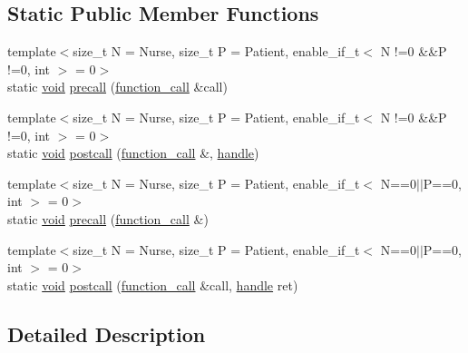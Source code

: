 \subsection*{Static Public Member Functions}
\begin{DoxyCompactItemize}
\item 
{\footnotesize template$<$size\+\_\+t N = Nurse, size\+\_\+t P = Patient, enable\+\_\+if\+\_\+t$<$ N !=0 \&\&\+P !=0, int $>$  = 0$>$ }\\static \mbox{\hyperlink{_s_d_l__opengles2__gl2ext_8h_ae5d8fa23ad07c48bb609509eae494c95}{void}} \mbox{\hyperlink{structprocess__attribute_3_01keep__alive_3_01_nurse_00_01_patient_01_4_01_4_a2204d919885c6255592c878d436b0dd9}{precall}} (\mbox{\hyperlink{structfunction__call}{function\+\_\+call}} \&call)
\item 
{\footnotesize template$<$size\+\_\+t N = Nurse, size\+\_\+t P = Patient, enable\+\_\+if\+\_\+t$<$ N !=0 \&\&\+P !=0, int $>$  = 0$>$ }\\static \mbox{\hyperlink{_s_d_l__opengles2__gl2ext_8h_ae5d8fa23ad07c48bb609509eae494c95}{void}} \mbox{\hyperlink{structprocess__attribute_3_01keep__alive_3_01_nurse_00_01_patient_01_4_01_4_a938350d8359b6dcceab9b9c0ec264fe4}{postcall}} (\mbox{\hyperlink{structfunction__call}{function\+\_\+call}} \&, \mbox{\hyperlink{classhandle}{handle}})
\item 
{\footnotesize template$<$size\+\_\+t N = Nurse, size\+\_\+t P = Patient, enable\+\_\+if\+\_\+t$<$ N==0$\vert$$\vert$\+P==0, int $>$  = 0$>$ }\\static \mbox{\hyperlink{_s_d_l__opengles2__gl2ext_8h_ae5d8fa23ad07c48bb609509eae494c95}{void}} \mbox{\hyperlink{structprocess__attribute_3_01keep__alive_3_01_nurse_00_01_patient_01_4_01_4_afb78d6550e0edc2aa66c8ab8a3397f12}{precall}} (\mbox{\hyperlink{structfunction__call}{function\+\_\+call}} \&)
\item 
{\footnotesize template$<$size\+\_\+t N = Nurse, size\+\_\+t P = Patient, enable\+\_\+if\+\_\+t$<$ N==0$\vert$$\vert$\+P==0, int $>$  = 0$>$ }\\static \mbox{\hyperlink{_s_d_l__opengles2__gl2ext_8h_ae5d8fa23ad07c48bb609509eae494c95}{void}} \mbox{\hyperlink{structprocess__attribute_3_01keep__alive_3_01_nurse_00_01_patient_01_4_01_4_a6ceb3b0fe29a57c56d18b3f1dfcd09eb}{postcall}} (\mbox{\hyperlink{structfunction__call}{function\+\_\+call}} \&call, \mbox{\hyperlink{classhandle}{handle}} ret)
\end{DoxyCompactItemize}


\subsection{Detailed Description}
